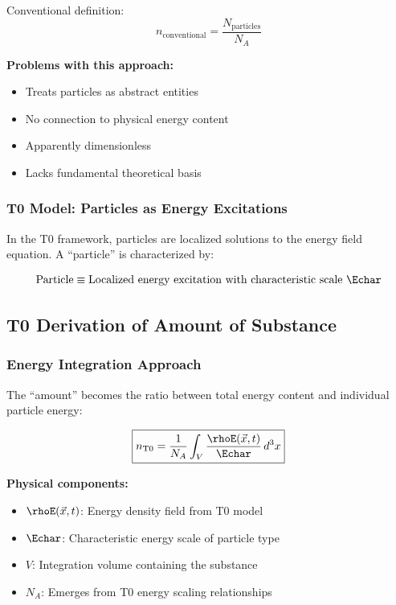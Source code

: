 	Conventional definition:
	\begin{equation}
		n_{\text{conventional}} = \frac{N_{\text{particles}}}{N_A}
		\label{eq:conventional_mol}
	\end{equation}
	
	\textbf{Problems with this approach:}
	\begin{itemize}
		\item Treats particles as abstract entities
		\item No connection to physical energy content
		\item Apparently dimensionless
		\item Lacks fundamental theoretical basis
	\end{itemize}
	
	\subsubsection{T0 Model: Particles as Energy Excitations}
	\label{subsubsec:t0_particles_energy}
	
	In the T0 framework, particles are localized solutions to the energy field equation. A ``particle'' is characterized by:
	
	\begin{equation}
		\text{Particle} \equiv \text{Localized energy excitation with characteristic scale } \Echar
		\label{eq:t0_particle_definition}
	\end{equation}
	
	\subsection{T0 Derivation of Amount of Substance}
	\label{subsec:t0_mol_derivation}
	
	\subsubsection{Energy Integration Approach}
	\label{subsubsec:energy_integration}
	
	The ``amount'' becomes the ratio between total energy content and individual particle energy:
	
	\begin{equation}
		\boxed{n_{\text{T0}} = \frac{1}{N_A} \int_V \frac{\rhoE(\vec{x},t)}{\Echar} \, d^3x}
		\label{eq:t0_mol_fundamental}
	\end{equation}
	
	\textbf{Physical components:}
	\begin{itemize}
		\item $\rhoE(\vec{x},t)$: Energy density field from T0 model
		\item $\Echar$: Characteristic energy scale of particle type
		\item $V$: Integration volume containing the substance
		\item $N_A$: Emerges from T0 energy scaling relationships
	\end{itemize}
	
